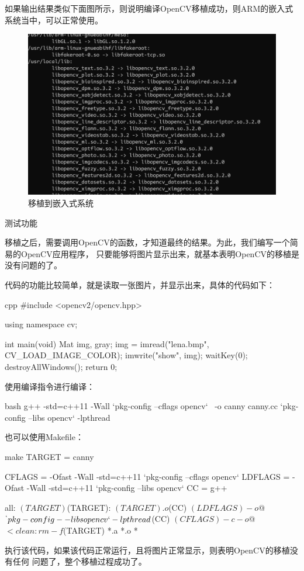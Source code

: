 \begin{outline}[enumerate]
如果输出结果类似下面图所示，则说明编译OpenCV移植成功，则ARM的嵌入式系统当中，可以正常使用。
\begin{figure}[H]
  \centering
  \includegraphics[width=\linewidth]{cross_transplant.png}
  \caption{移植到嵌入式系统}
  \label{fig:cross_transplant}
\end{figure}

\1 测试功能

移植之后，需要调用OpenCV的函数，才知道最终的结果。为此，我们编写一个简易的OpenCV应用程序，
只要能够将图片显示出来，就基本表明OpenCV的移植是没有问题的了。

代码的功能比较简单，就是读取一张图片，并显示出来，具体的代码如下：
\begin{code-in-enumerate}{cpp}
#include <opencv2/opencv.hpp>

using namespace cv;

int main(void)
{
        Mat img, gray;
        img = imread("lena.bmp", CV_LOAD_IMAGE_COLOR);
        imwrite("show", img);
        waitKey(0);
        destroyAllWindows();
        return 0;
}
\end{code-in-enumerate}

使用编译指令进行编译：
\begin{code-in-enumerate}{bash}
g++ -std=c++11 -Wall `pkg-config --cflags opencv` \
    -o canny canny.cc  `pkg-config --libs opencv` -lpthread
\end{code-in-enumerate}

也可以使用Makefile：
\begin{code-in-enumerate}{make}
TARGET = canny

CFLAGS = -Ofast -Wall -std=c++11 `pkg-config --cflags opencv`
LDFLAGS = -Ofast -Wall -std=c++11 `pkg-config --libs opencv`
CC = g++

all: $(TARGET)

$(TARGET): $(TARGET).o
        $(CC) $(LDFLAGS) -o $@ $^ `pkg-config --libs opencv` -lpthread

        $(CC) $(CFLAGS) -c -o $@ $<

clean:
        rm -f $(TARGET) *.a *.o *~
\end{code-in-enumerate}

执行该代码，如果该代码正常运行，且将图片正常显示，则表明OpenCV的移植没有任何
问题了，整个移植过程成功了。

\end{outline}

